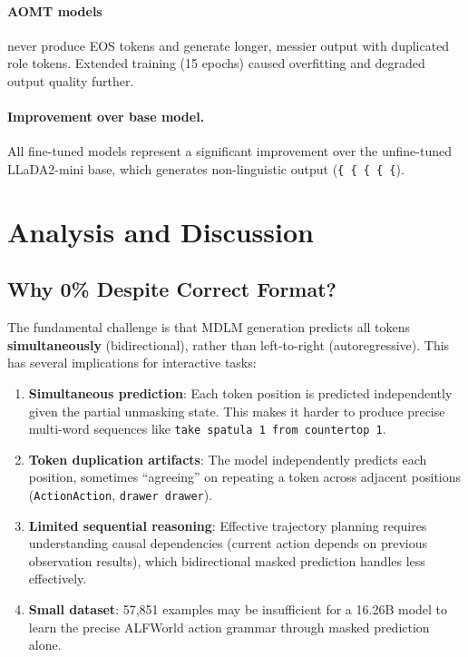 \documentclass[11pt,a4paper]{article}
\begin{document}
\paragraph{AOMT models} never produce EOS tokens and generate longer, messier output with duplicated role tokens. Extended training (15 epochs) caused overfitting and degraded output quality further.

\paragraph{Improvement over base model.} All fine-tuned models represent a significant improvement over the unfine-tuned LLaDA2-mini base, which generates non-linguistic output (\texttt{\{ \{ \{ \{ \{}).

\section{Analysis and Discussion}

\subsection{Why 0\% Despite Correct Format?}

The fundamental challenge is that MDLM generation predicts all tokens \textbf{simultaneously} (bidirectional), rather than left-to-right (autoregressive). This has several implications for interactive tasks:

\begin{enumerate}
  \item \textbf{Simultaneous prediction}: Each token position is predicted independently given the partial unmasking state. This makes it harder to produce precise multi-word sequences like \texttt{take spatula 1 from countertop 1}.
  
  \item \textbf{Token duplication artifacts}: The model independently predicts each position, sometimes ``agreeing'' on repeating a token across adjacent positions (\texttt{ActionAction}, \texttt{drawer drawer}).
  
  \item \textbf{Limited sequential reasoning}: Effective trajectory planning requires understanding causal dependencies (current action depends on previous observation results), which bidirectional masked prediction handles less effectively.
  
  \item \textbf{Small dataset}: 57,851 examples may be insufficient for a 16.26B model to learn the precise ALFWorld action grammar through masked prediction alone.
\end{enumerate}
\end{document}
